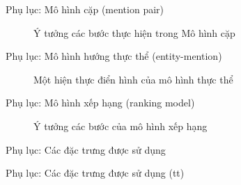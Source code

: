 \documentclass[9pt,xcolor=table,hyperref=unicode]{beamer}
\begin{document}
		\begin{frame}{Phụ lục: Mô hình cặp (mention pair)}
			\begin{figure}[H]
				\centering
				\scalebox{.8}{}
				\caption{Ý tưởng các bước thực hiện trong Mô hình cặp}
				\label{fig:mentionpair}
			\end{figure}
		\end{frame}

		\begin{frame}{Phụ lục: Mô hình hướng thực thể (entity-mention)}
			\begin{figure}[H]
				\centering
				\scalebox{.8}{}
				\caption{Một hiện thực điển hình của mô hình thực thể}
				\label{fig:entitymention}
			\end{figure}
		\end{frame}

		\begin{frame}{Phụ lục: Mô hình xếp hạng (ranking model)}
			\begin{figure}[H]
				\centering
				\scalebox{.8}{}
				\caption{Ý tưởng các bước của mô hình xếp hạng}
				\label{fig:rankingmodel}
			\end{figure}
		\end{frame}

		\begin{frame}{Phụ lục: Các đặc trưng được sử dụng}		
			\begin{table}[]		
			\parbox{\textwidth}{
				\centering			
				\fontsize{6pt}{7}\selectfont		
					
				\caption{Các đặc trưng được sử dụng trong hệ thống}
			}
			\end{table}
		\end{frame}	

		\begin{frame}{Phụ lục: Các đặc trưng được sử dụng (tt)}				
			\begin{table}[]		
			\parbox{\textwidth}{
				\centering
				\fontsize{6pt}{7}\selectfont			
					
				\caption{Các đặc trưng được sử dụng trong hệ thống (tt)}
			}
			\end{table}		
		\end{frame}
\end{document}
